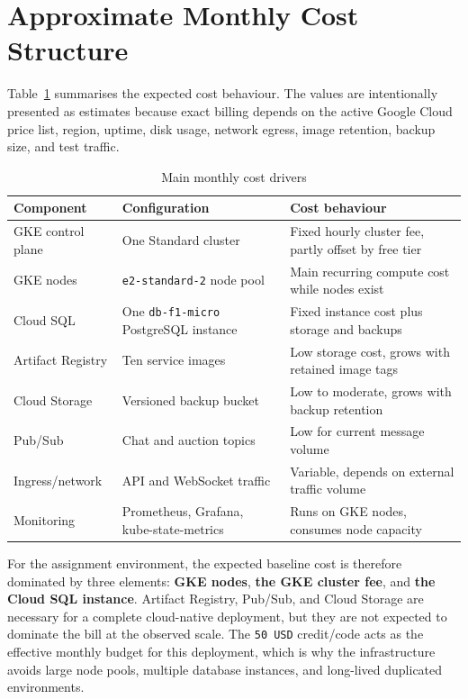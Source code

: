 \newpage 

\section{Approximate Monthly Cost Structure}

Table~\ref{tab:cost-drivers} summarises the expected cost behaviour. The values are intentionally presented as estimates because exact billing depends on the active Google Cloud price list, region, uptime, disk usage, network egress, image retention, backup size, and test traffic.

\begin{table}[H]
    \centering
    \small
    \begin{tabular}{p{}p{}p{}}
        \toprule
        Component & Configuration & Cost behaviour \\
        \midrule
        GKE control plane & One Standard cluster & Fixed hourly cluster fee, partly offset by free tier \\
        GKE nodes & \texttt{e2-standard-2} node pool & Main recurring compute cost while nodes exist \\
        Cloud SQL & One \texttt{db-f1-micro} PostgreSQL instance & Fixed instance cost plus storage and backups \\
        Artifact Registry & Ten service images & Low storage cost, grows with retained image tags \\
        Cloud Storage & Versioned backup bucket & Low to moderate, grows with backup retention \\
        Pub/Sub & Chat and auction topics & Low for current message volume \\
        Ingress/network & API and WebSocket traffic & Variable, depends on external traffic volume \\
        Monitoring & Prometheus, Grafana, kube-state-metrics & Runs on GKE nodes, consumes node capacity \\
        \bottomrule
    \end{tabular}
    \caption{Main monthly cost drivers}
    \label{tab:cost-drivers}
\end{table}

For the assignment environment, the expected baseline cost is therefore dominated by three elements: \textbf{GKE nodes}, \textbf{the GKE cluster fee}, and \textbf{the Cloud SQL instance}. Artifact Registry, Pub/Sub, and Cloud Storage are necessary for a complete cloud-native deployment, but they are not expected to dominate the bill at the observed scale. The \texttt{50 USD} credit/code acts as the effective monthly budget for this deployment, which is why the infrastructure avoids large node pools, multiple database instances, and long-lived duplicated environments.

